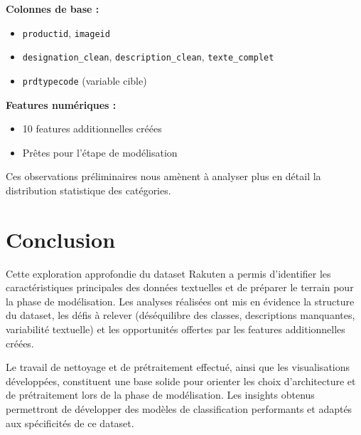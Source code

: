 \documentclass[12pt,a4paper]{article}
\begin{document}
\textbf{Colonnes de base :}
\begin{itemize}
    \item \texttt{productid}, \texttt{imageid}
    \item \texttt{designation\_clean}, \texttt{description\_clean}, \texttt{texte\_complet}
    \item \texttt{prdtypecode} (variable cible)
\end{itemize}

\textbf{Features numériques :}
\begin{itemize}
    \item 10 features additionnelles créées
    \item Prêtes pour l'étape de modélisation
\end{itemize}

Ces observations préliminaires nous amènent à analyser plus en détail la distribution statistique des catégories.

\section{Conclusion}

Cette exploration approfondie du dataset Rakuten a permis d'identifier les caractéristiques principales des données textuelles et de préparer le terrain pour la phase de modélisation. Les analyses réalisées ont mis en évidence la structure du dataset, les défis à relever (déséquilibre des classes, descriptions manquantes, variabilité textuelle) et les opportunités offertes par les features additionnelles créées.

Le travail de nettoyage et de prétraitement effectué, ainsi que les visualisations développées, constituent une base solide pour orienter les choix d'architecture et de prétraitement lors de la phase de modélisation. Les insights obtenus permettront de développer des modèles de classification performants et adaptés aux spécificités de ce dataset.
\end{document}
